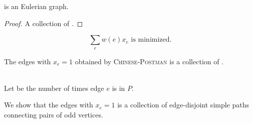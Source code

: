\begin{frame}{}
  \begin{lemma}
    \begin{center}
       is an Eulerian graph.
    \end{center}
  \end{lemma}

  \pause
  \vspace{0.60cm}
  \begin{proof} 
    A collection of .
  \end{proof}
\end{frame}

\begin{frame}{}
  \begin{lemma}
    \begin{center}
      \[
	\sum_{e} w(e) x_{e} \text{ is minimized.}
      \]
    \end{center}
  \end{lemma}

  \pause
  \vspace{0.30cm}
  \begin{theorem}
    \begin{center}
      The edges with $x_{e} = 1$ obtained by \textsc{Chinese-Postman}
      is a  collection of .
    \end{center}
  \end{theorem}

  \pause
  \begin{center}
     \\[5pt] \pause
    Let  be the number of times edge $e$ is in $P$. \\[8pt] \pause

    We show that the edges with $x_e = 1$ is a collection of edge-disjoint simple paths connecting pairs of odd vertices.
  \end{center}
\end{frame}

